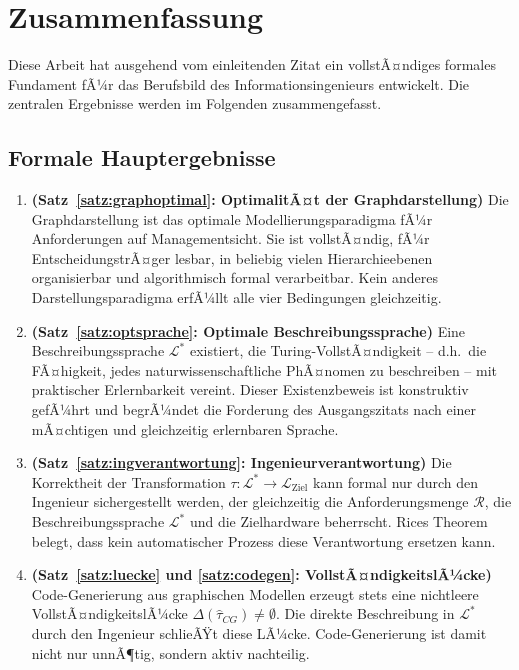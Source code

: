 ﻿\documentclass[a4paper,12pt]{article}
\theoremstyle{definition}
\begin{document}
\section{Zusammenfassung}
\label{sec:zusammenfassung}

Diese Arbeit hat ausgehend vom einleitenden Zitat ein vollstÃ¤ndiges formales
Fundament fÃ¼r das Berufsbild des Informationsingenieurs entwickelt.
Die zentralen Ergebnisse werden im Folgenden zusammengefasst.

\subsection{Formale Hauptergebnisse}

\begin{enumerate}
  \item \textbf{(Satz~\ref{satz:graphoptimal}: OptimalitÃ¤t der Graphdarstellung)}
        Die Graphdarstellung ist das optimale Modellierungsparadigma fÃ¼r Anforderungen
        auf Managementsicht. Sie ist vollstÃ¤ndig, fÃ¼r EntscheidungstrÃ¤ger lesbar,
        in beliebig vielen Hierarchieebenen organisierbar und algorithmisch formal
        verarbeitbar. Kein anderes Darstellungsparadigma erfÃ¼llt alle vier Bedingungen
        gleichzeitig.

  \item \textbf{(Satz~\ref{satz:optsprache}: Optimale Beschreibungssprache)}
        Eine Beschreibungssprache $\mathcal{L}^*$ existiert, die Turing-VollstÃ¤ndigkeit
        -- d.h.\ die FÃ¤higkeit, jedes naturwissenschaftliche PhÃ¤nomen zu beschreiben --
        mit praktischer Erlernbarkeit vereint. Dieser Existenzbeweis ist konstruktiv
        gefÃ¼hrt und begrÃ¼ndet die Forderung des Ausgangszitats nach einer mÃ¤chtigen
        und gleichzeitig erlernbaren Sprache.

  \item \textbf{(Satz~\ref{satz:ingverantwortung}: Ingenieurverantwortung)}
        Die Korrektheit der Transformation $\tau: \mathcal{L}^* \to \mathcal{L}_{\text{Ziel}}$
        kann formal nur durch den Ingenieur sichergestellt werden, der gleichzeitig
        die Anforderungsmenge $\mathcal{R}$, die Beschreibungssprache $\mathcal{L}^*$
        und die Zielhardware beherrscht. Rices Theorem belegt, dass kein automatischer
        Prozess diese Verantwortung ersetzen kann.

  \item \textbf{(Satz~\ref{satz:luecke} und \ref{satz:codegen}: VollstÃ¤ndigkeitslÃ¼cke)}
        Code-Generierung aus graphischen Modellen erzeugt stets eine nichtleere
        VollstÃ¤ndigkeitslÃ¼cke $\Delta(\hat{\tau}_{CG}) \neq \emptyset$.
        Die direkte Beschreibung in $\mathcal{L}^*$ durch den Ingenieur schlieÃŸt
        diese LÃ¼cke. Code-Generierung ist damit nicht nur unnÃ¶tig, sondern aktiv nachteilig.


\end{enumerate}
\end{document}
